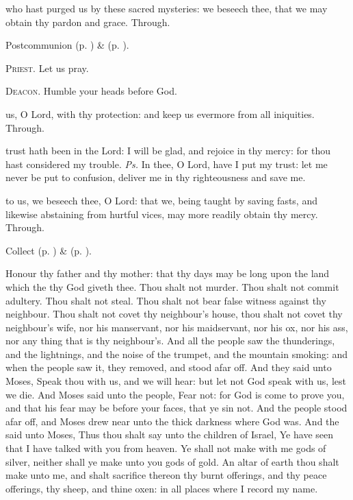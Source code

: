\postcommunion
{} who hast purged us by these sacred mysteries: we beseech thee, that we may obtain thy pardon and grace. Through.


\begin{rubric}
     Postcommunion  (p. \pageref{AshWednesdayMassPostcommunion}) \&   (p. \pageref{SPLivingDeparted}).
\end{rubric}

\textsc{Priest.} Let us pray.\par
\textsc{Deacon.} Humble your heads before God.\par
{} us, O Lord, with thy protection: and keep us evermore from all iniquities. Through.



\introit
{} trust hath been in the Lord: I will be glad, and rejoice in thy mercy: for thou hast considered my trouble. \textit{Ps.} In thee, O Lord, have I put my trust: let me never be put to confusion, deliver me in thy righteousness and save me.

\collect
{} to us, we beseech thee, O Lord: that we, being taught by saving fasts, and likewise abstaining from hurtful vices, may more readily obtain thy mercy. Through.
\begin{rubric}
     Collect  (p. \pageref{AshWednesdayMassCollect}) \&   (p. \pageref{SPLivingDeparted}).
\end{rubric}

 Honour thy father and thy mother: that thy days may be long upon the land which the  thy God giveth thee. Thou shalt not murder. Thou shalt not commit adultery. Thou shalt not steal. Thou shalt not bear false witness against thy neighbour. Thou shalt not covet thy neighbour's house, thou shalt not covet thy neighbour's wife, nor his manservant, nor his maidservant, nor his ox, nor his ass, nor any thing that is thy neighbour's. And all the people saw the thunderings, and the lightnings, and the noise of the trumpet, and the mountain smoking: and when the people saw it, they removed, and stood afar off. And they said unto Moses, Speak thou with us, and we will hear: but let not God speak with us, lest we die. And Moses said unto the people, Fear not: for God is come to prove you, and that his fear may be before your faces, that ye sin not. And the people stood afar off, and Moses drew near unto the thick darkness where God was. And the  said unto Moses, Thus thou shalt say unto the children of Israel, Ye have seen that I have talked with you from heaven. Ye shall not make with me gods of silver, neither shall ye make unto you gods of gold. An altar of earth thou shalt make unto me, and shalt sacrifice thereon thy burnt offerings, and thy peace offerings, thy sheep, and thine oxen: in all places where I record my name.

